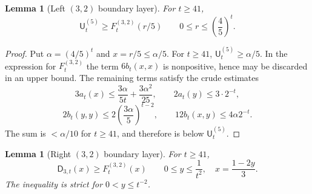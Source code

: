 \documentclass[11pt]{article}
\newtheorem{lemma}[theorem]{Lemma}
\theoremstyle{definition}
\begin{document}
\begin{lemma}[Left $(3,2)$ boundary layer]\label{lem:32-left-layer}
For $t\ge41$,
\[
  \mathsf U^{(5)}_t\ge F^{(3,2)}_t(r/5)
  \qquad
  0\le r\le\left(\frac45\right)^t.
\]
\end{lemma}

\begin{proof}
Put $\alpha=(4/5)^t$ and $x=r/5\le\alpha/5$.  For $t\ge41$,
$\mathsf U^{(5)}_t\ge \alpha/5$.  In the expression for $F^{(3,2)}_t$ the
term $6b_t(x,x)$ is nonpositive, hence may be discarded in an upper bound.
The remaining terms satisfy the crude estimates
\[
  3a_t(x)\le \frac{3\alpha}{5t}+\frac{3\alpha^2}{25},
  \qquad
  2a_t(y)\le 3\cdot2^{-t},
\]
\[
  2b_t(y,y)\le2\left(\frac{3\alpha}{5}\right)^{t-2},
  \qquad
  12b_t(x,y)\le4\alpha2^{-t}.
\]
The sum is $<\alpha/10$ for $t\ge41$, and therefore is below
$\mathsf U^{(5)}_t$.
\end{proof}

\begin{lemma}[Right $(3,2)$ boundary layer]\label{lem:32-right-layer}
For $t\ge41$,
\[
  \mathsf D_{3,t}(x)\ge F^{(3,2)}_t(x)
  \qquad
  0\le y\le\frac1{t^2},
  \quad x=\frac{1-2y}{3}.
\]
The inequality is strict for $0<y\le t^{-2}$.
\end{lemma}
\end{document}
